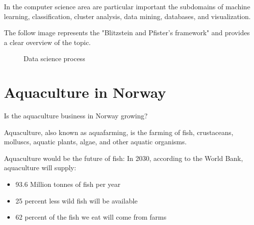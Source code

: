 In the computer science area are particular important the subdomains of machine learning, classification, cluster analysis, data mining, databases, and visualization.

The follow image represents the "Blitzstein and Pfister's framework" and provides a clear overview of the topic.

\begin{figure}[H]
    \centering
    \caption[Data science process]{Data science process}
    \label{fig: Data_science}
\end{figure}



\newpage

\section{Aquaculture in Norway}

Is the aquaculture business in Norway growing? 
  
Aquaculture, also known as aquafarming, is the farming of fish, crustaceans, molluscs, aquatic plants, algae, and other aquatic organisms.

Aquaculture would be the future of fish:
In 2030, according to the World Bank, aquaculture will supply:
\begin{itemize}
\item 93.6 Million tonnes of fish per year
\item 25 percent less wild fish will be available
\item 62 percent of the fish we eat will come from farms
\end{itemize}


